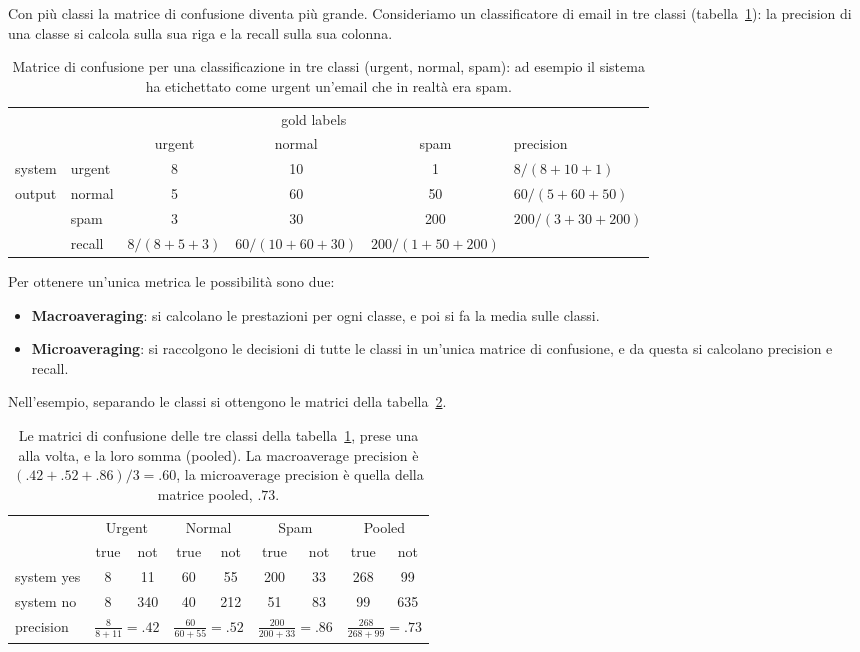 Con più classi la matrice di confusione diventa più grande. Consideriamo un classificatore di email in tre classi (tabella~\ref{tab:confusion3}): la precision di una classe si calcola sulla sua riga e la recall sulla sua colonna.

\begin{table}[htbp]
\centering
\small
\begin{tabular}{ll|ccc|l}
\toprule
 & & \multicolumn{3}{c|}{gold labels} & \\
 & & urgent & normal & spam & precision \\
\midrule
system & urgent & 8 & 10 & 1 & $8/(8 + 10 + 1)$ \\
output & normal & 5 & 60 & 50 & $60/(5 + 60 + 50)$ \\
 & spam & 3 & 30 & 200 & $200/(3 + 30 + 200)$ \\
\midrule
 & recall & $8/(8 + 5 + 3)$ & $60/(10 + 60 + 30)$ & $200/(1 + 50 + 200)$ & \\
\bottomrule
\end{tabular}
\caption{Matrice di confusione per una classificazione in tre classi (urgent, normal, spam): ad esempio il sistema ha etichettato come urgent un'email che in realtà era spam.}
\label{tab:confusion3}
\end{table}

Per ottenere un'unica metrica le possibilità sono due:
\begin{itemize}
    \item \textbf{Macroaveraging}: si calcolano le prestazioni per ogni classe, e poi si fa la media sulle classi.
    \item \textbf{Microaveraging}: si raccolgono le decisioni di tutte le classi in un'unica matrice di confusione, e da questa si calcolano precision e recall.
\end{itemize}
Nell'esempio, separando le classi si ottengono le matrici della tabella~\ref{tab:micro-macro}.

\begin{table}[htbp]
\centering
\small
\begin{tabular}{l|cc|cc|cc|cc}
\toprule
 & \multicolumn{2}{c|}{Urgent} & \multicolumn{2}{c|}{Normal} & \multicolumn{2}{c|}{Spam} & \multicolumn{2}{c}{Pooled} \\
 & true & not & true & not & true & not & true & not \\
\midrule
system yes & 8 & 11 & 60 & 55 & 200 & 33 & 268 & 99 \\
system no & 8 & 340 & 40 & 212 & 51 & 83 & 99 & 635 \\
\midrule
precision & \multicolumn{2}{c|}{$\frac{8}{8 + 11} = .42$} & \multicolumn{2}{c|}{$\frac{60}{60 + 55} = .52$} & \multicolumn{2}{c|}{$\frac{200}{200 + 33} = .86$} & \multicolumn{2}{c}{$\frac{268}{268 + 99} = .73$} \\
\bottomrule
\end{tabular}
\caption{Le matrici di confusione delle tre classi della tabella~\ref{tab:confusion3}, prese una alla volta, e la loro somma (pooled). La macroaverage precision è $(.42 + .52 + .86)/3 = .60$, la microaverage precision è quella della matrice pooled, $.73$.}
\label{tab:micro-macro}
\end{table}

